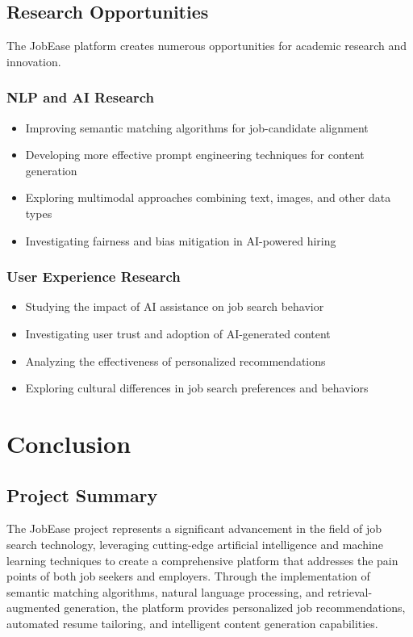 \documentclass[12pt,a4paper]{report}
\begin{document}
\section{Research Opportunities}
The JobEase platform creates numerous opportunities for academic research and innovation.

\subsection{NLP and AI Research}
\begin{itemize}[leftmargin=2em]
  \item Improving semantic matching algorithms for job-candidate alignment
  \item Developing more effective prompt engineering techniques for content generation
  \item Exploring multimodal approaches combining text, images, and other data types
  \item Investigating fairness and bias mitigation in AI-powered hiring
\end{itemize}

\subsection{User Experience Research}
\begin{itemize}[leftmargin=2em]
  \item Studying the impact of AI assistance on job search behavior
  \item Investigating user trust and adoption of AI-generated content
  \item Analyzing the effectiveness of personalized recommendations
  \item Exploring cultural differences in job search preferences and behaviors
\end{itemize}

\chapter{Conclusion}

\section{Project Summary}
The JobEase project represents a significant advancement in the field of job search technology, leveraging cutting-edge artificial intelligence and machine learning techniques to create a comprehensive platform that addresses the pain points of both job seekers and employers. Through the implementation of semantic matching algorithms, natural language processing, and retrieval-augmented generation, the platform provides personalized job recommendations, automated resume tailoring, and intelligent content generation capabilities.
\end{document}
